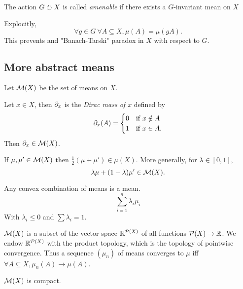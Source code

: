     \begin{definition}
        The action $G \circlearrowright X$ is called \emph{amenable}
        if there exists a $G$-invariant mean on $X$
    \end{definition}

    Explocitly, \[
        \forall g \in G~
        \forall A \subseteq X,
        \mu(A) = \mu(gA). 
    \]
    This prevents and "Banach-Tarski" paradox in $X$ with respect to $G$.

    \subsection{More abstract means}

    Let $\mathcal{M}(X)$ be the set of means on $X$.
    \begin{example}
        Let $x \in X$, then $\partial_x$ is the \emph{Dirac mass of $x$} defined by
        \[
            \partial_x(A) = \begin{cases} 
                0 & \text{if } x \notin A \\
                1 & \text{if } x \in A.
            \end{cases} 
        \]
        Then $\partial_x \in \mathcal{M}(X)$.
    \end{example}

    \begin{lemma}
        If $\mu, \mu' \in \mathcal{M}(X)$ then
        $\frac{1}{2}(\mu + \mu') \in \mu(X)$.
        More generally, for $\lambda \in [0, 1]$, 
        \[
            \lambda\mu + (1 - \lambda)\mu' \in \mathcal{M}(X).
        \]
    \end{lemma}

    \begin{corollary}
        Any convex combination of means is a mean.
        \[
            \sum_{i = 1}^n \lambda_i \mu_i
        \]
        With $\lambda_i \leq 0$ and $\sum \lambda_i = 1$.
    \end{corollary}

    \begin{remark}
        $\mathcal{M}(X)$ is a subset of the vector space $\mathbb R^{\mathcal{P}(X)}$
        of all functions $\mathcal{P}(X) \to \mathbb R$.
        We endow $\mathbb R^{\mathcal{P}(X)}$ with the product topology, 
        which is the topology of pointwise convergence.
        Thus a sequence $(\mu_n)$ of means converges to $\mu$
        iff $\forall A \subseteq X, \mu_n(A) \to \mu(A)$.
    \end{remark}

    \begin{proposition}
        $\mathcal{M}(X)$ is compact.
    \end{proposition}

